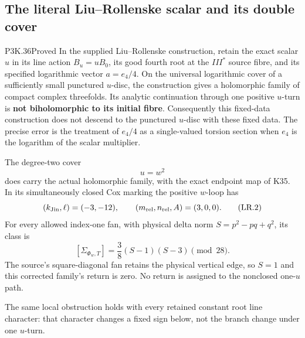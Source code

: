 \subsection{The literal Liu--Rollenske scalar and its double cover}
\begin{statement}{P3K.36}{Proved}
In the supplied Liu--Rollenske construction, retain the exact scalar
\(u\) in its line action \(B_u=uB_0\), its good fourth root at the
\(III^*\) source fibre, and its specified logarithmic vector
\(a=e_4/4\). On the universal logarithmic cover of a sufficiently small
punctured \(u\)-disc, the construction gives a holomorphic family of
compact complex threefolds. Its analytic continuation through one
positive \(u\)-turn is \textbf{not biholomorphic to its initial fibre}.
Consequently this fixed-data construction does not descend to the
punctured \(u\)-disc with these fixed data. The precise error is the treatment of
\(e_4/4\) as a single-valued torsion section when \(e_4\) is the
logarithm of the scalar multiplier.

The degree-two cover
\[
                         u=w^2                                      \tag{LR.1}
\]
does carry the actual holomorphic family, with the exact endpoint map
of K35. In its simultaneously closed Cox marking the positive
\(w\)-loop has
\[
 (k_{\rm Jin},\ell)=(-3,-12),\qquad
 (m_{\rm rel},n_{\rm rel},A)=(3,0,0).                 \tag{LR.2}
\]
For every allowed index-one fan, with physical delta norm
\(S=p^2-pq+q^2\), its class is
\[
       [\Sigma_{\Phi_w,T}]
              =\frac38(S-1)(S-3)\pmod {28}.           \tag{LR.3}
\]
The source's square-diagonal fan retains the physical vertical edge,
so \(S=1\) and this corrected family's return is zero. No return is
assigned to the nonclosed one-\(u\) path.

The same local obstruction holds with every retained constant root
line character: that character changes a fixed sign below, not the
branch change under one \(u\)-turn.

\end{statement}
